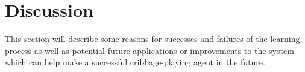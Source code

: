 \section{Discussion}
\label{sec:disc}



This section will describe some reasons for successes and failures of the learning
process as well as potential future applications or improvements to the
system which can help make a successful cribbage-playing agent in the future.









